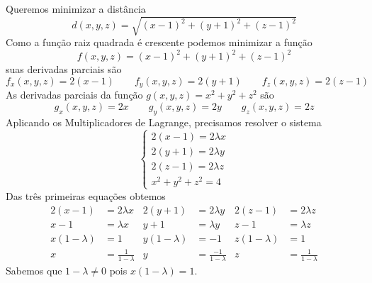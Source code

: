 \documentclass[a4paper,12pt,fleqn]{article}
\begin{document}
\begin{answer}
  Queremos minimizar a distância
  \[
    d(x, y, z) = \sqrt{(x-1)^2 + (y+1)^2 + (z-1)^2}
  \]
  Como a função raiz quadrada é crescente podemos minimizar a função
  \[
    f(x, y, z) = (x-1)^2 + (y+1)^2 + (z-1)^2
  \]
  suas derivadas parciais são
  \[
    f_x(x, y, z) = 2(x-1)
    \qquad
    f_y(x, y, z) = 2(y+1)
    \qquad
    f_z(x, y, z) = 2(z-1)
  \]
  As derivadas parciais da função \(g(x, y, z)=x^2+y^2+z^2\) são
  \[
    g_x(x, y, z) = 2x
    \qquad
    g_y(x, y, z) = 2y
    \qquad
    g_z(x, y, z) = 2z
  \]
  Aplicando os Multiplicadores de Lagrange, precisamos resolver o sistema
  \[
  \begin{cases}
    2(x-1) = 2\lambda x \\
    2(y+1) = 2\lambda y \\
    2(z-1) = 2\lambda z \\
    x^2 + y^2 + z^2 = 4
  \end{cases}
  \]
  Das três primeiras equações obtemos
  \begin{align*}
    2(x-1)       & = 2\lambda x          & 2(y+1)       & = 2\lambda y          & 2(z-1)       & = 2\lambda z          \\
    x-1          & = \lambda x           & y+1          & = \lambda y           & z-1          & = \lambda z           \\
    x(1-\lambda) & = 1                   & y(1-\lambda) & = -1                  & z(1-\lambda) & = 1                   \\
    x            & = \frac{1}{1-\lambda} & y            & =\frac{-1}{1-\lambda} & z            & = \frac{1}{1-\lambda}
  \end{align*}
  Sabemos que \(1-\lambda\neq 0\) pois \(x(1-\lambda) = 1\).


\end{answer}
\end{document}
